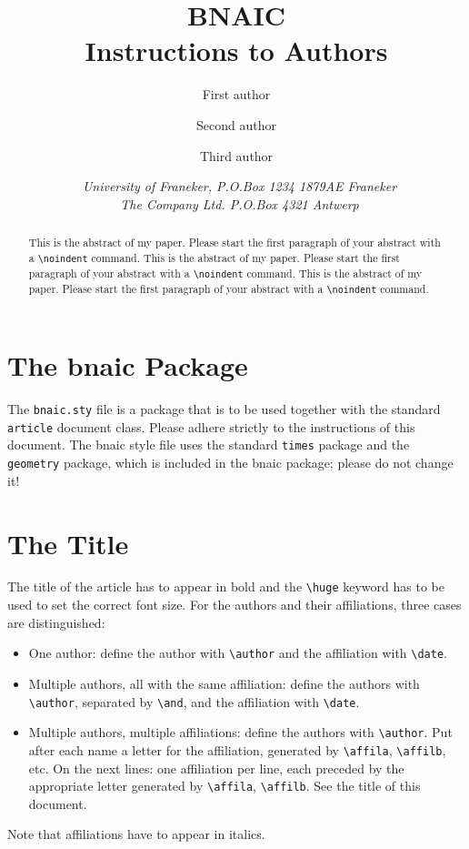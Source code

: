 \documentclass{article}
\title{\textbf{\huge BNAIC\\ Instructions to Authors}}
\author{First author \affila \and
    Second author \affilb \and
    Third author \affila}
\date{\affila\ \textit{University of Franeker, P.O.Box 1234 1879AE Franeker}\\
    \affilb\ \textit{The Company Ltd. P.O.Box 4321 Antwerp}}
\begin{document}
\ttl
\thispagestyle{empty}


\begin{abstract}
\noindent
This is the abstract of my paper. Please start the first paragraph of your abstract with a \verb+\noindent+ command.
This is the abstract of my paper. Please start the first paragraph of your abstract with a \verb+\noindent+ command.
This is the abstract of my paper. Please start the first paragraph of your abstract with a \verb+\noindent+ command.
\end{abstract}


\section{The bnaic Package}

The \verb+bnaic.sty+ file is a package that is to be used together with
the standard \verb+article+ document class. Please adhere strictly to the instructions of this document. The bnaic style file uses the standard \verb+times+ package and the \verb+geometry+ package, which is included in the bnaic package; please do not change it! 

\section{The Title}

The title of the article has to appear in bold and the \verb+\huge+ keyword has to be used to set the correct font size. For
the authors and their affiliations, three cases are distinguished:

\begin{itemize}
\item One author: define the author with \verb+\author+ and the affiliation
   with \verb+\date+.
\item Multiple authors, all with the same affiliation: define the authors with
   \verb+\author+, separated by \verb+\and+, and the affiliation with
   \verb+\date+.
\item Multiple authors, multiple affiliations: define the
   authors with \verb+\author+. Put after each name a letter for the
   affiliation, generated by \verb+\affila+, \verb+\affilb+, etc. On the
   next lines: one affiliation per line, each preceded by the appropriate letter
   generated by \verb+\affila+, \verb+\affilb+. See the title of this document.
\end{itemize}

Note that affiliations have to appear in italics.
\end{document}
